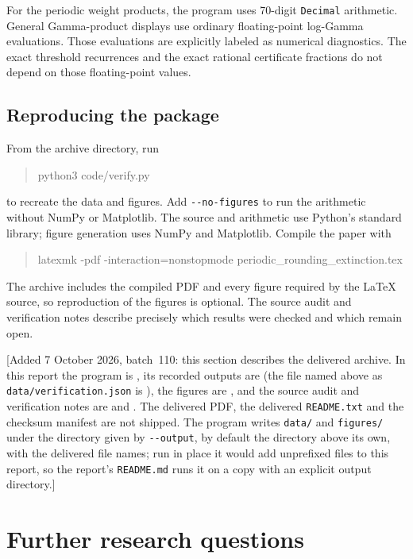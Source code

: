 For the periodic weight products, the program uses 70-digit
\texttt{Decimal} arithmetic. General Gamma-product displays use
ordinary floating-point log-Gamma evaluations. Those evaluations
are explicitly labeled as numerical diagnostics. The exact
threshold recurrences and the exact rational certificate fractions
do not depend on those floating-point values.

\FloatBarrier
\subsection{Reproducing the package}

From the archive directory, run
\begin{quote}\ttfamily
python3 code/verify.py
\end{quote}
to recreate the data and figures. Add \texttt{-{}-no-figures} to
run the arithmetic without NumPy or Matplotlib. The source and
arithmetic use Python's standard library; figure generation uses
NumPy and Matplotlib. Compile the paper with
\begin{quote}\ttfamily\small
latexmk -pdf -interaction=nonstopmode periodic\_rounding\_extinction.tex
\end{quote}
The archive includes the compiled PDF and every figure required by
the LaTeX source, so reproduction of the figures is optional.
The source audit and verification notes describe precisely which
results were checked and which remain open.

[Added 7 October 2026, batch~110: this section describes the delivered
archive. In this report the program is ,
its recorded outputs are  (the file named above as
\texttt{data/verification.json} is
), the figures are
, and the source audit and verification notes
are  and
. The delivered PDF, the
delivered \texttt{README.txt} and the checksum manifest are not shipped. The
program writes \texttt{data/} and \texttt{figures/} under the directory
given by \texttt{-{}-output}, by default the directory above its own, with
the delivered file names; run in place it would add unprefixed files to
this report, so the report's \texttt{README.md} runs it on a copy with an
explicit output directory.]

\section{Further research questions}
\label{rex:sch:sec:questions}

